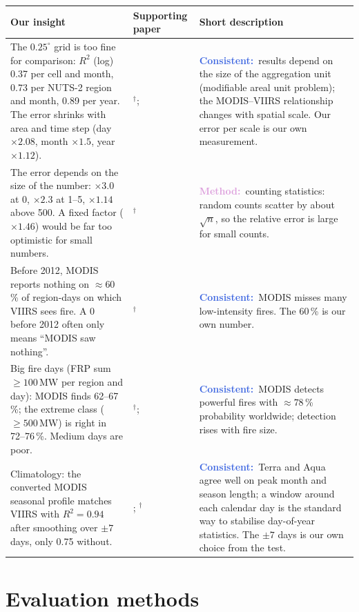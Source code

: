\documentclass[10pt,a4paper]{article}
\newcommand{\fitlabel}[2]{\textcolor{#1}{\textbf{#2}}}
\newcommand{\consistent}{\fitlabel{RoyalBlue}{Consistent:}}
\newcommand{\method}{\fitlabel{Plum}{Method:}}
\newcommand{\abs}{$^\dagger$}   %
\newenvironment{insighttable}{%
  \small
  \begin{longtable}{L{0.36\textwidth} L{0.17\textwidth} L{0.41\textwidth}}
  \toprule
  \textbf{Our insight} & \textbf{Supporting paper} & \textbf{Short description} \\
  \midrule
  \endhead
  \bottomrule
  \endfoot
}{%
  \end{longtable}
}
\begin{document}
\begin{insighttable}
The $0.25^\circ$ grid is too fine for comparison: $R^2$ (log) 0.37 per cell and month, 0.73 per NUTS-2 region
and month, 0.89 per year. The error shrinks with area and time step (day $\times 2.08$, month $\times 1.5$,
year $\times 1.12$).
& \citet{openshaw1984}\abs; \citet{li2018}
& \consistent\ results depend on the size of the aggregation unit (modifiable areal unit problem); the
MODIS--VIIRS relationship changes with spatial scale. Our error per scale is our own measurement. \\

The error depends on the size of the number: $\times 3.0$ at 0, $\times 2.3$ at 1--5, $\times 1.14$ above 500.
A fixed factor ($\times 1.46$) would be far too optimistic for small numbers.
& \citet{gehrels1986}\abs
& \method\ counting statistics: random counts scatter by about $\sqrt{n}$, so the relative error is large
for small counts. \\

Before 2012, MODIS reports nothing on $\approx 60$\,\% of region-days on which VIIRS sees fire. A 0 before 2012
often only means ``MODIS saw nothing''.
& \citet{li2020}\abs
& \consistent\ MODIS misses many low-intensity fires. The 60\,\% is our own number. \\

Big fire days (FRP sum $\geq 100$\,MW per region and day): MODIS finds 62--67\,\%; the extreme class
($\geq 500$\,MW) is right in 72--76\,\%. Medium days are poor.
& \citet{sofiev2026}\abs; \citet{giglio2016}
& \consistent\ MODIS detects powerful fires with $\approx 78$\,\% probability worldwide; detection rises with
fire size. \\

Climatology: the converted MODIS seasonal profile matches VIIRS with $R^2 = 0.94$ after smoothing over
$\pm 7$ days, only 0.75 without.
& \citet{giglio2006}; \citet{zhang2005}\abs
& \consistent\ Terra and Aqua agree well on peak month and season length; a window around each calendar day
is the standard way to stabilise day-of-year statistics. The $\pm 7$ days is our own choice from the test. \\
\end{insighttable}

\section{Evaluation methods}
\end{document}
